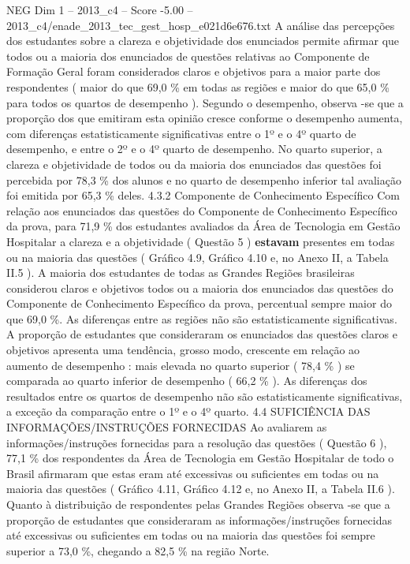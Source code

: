 \begin{textsample}{NEG Dim 1 – 2013\_c4 – Score -5.00 – 2013\_c4/enade\_2013\_tec\_gest\_hosp\_e021d6e676.txt}
A análise das percepções dos estudantes sobre a clareza e objetividade dos enunciados permite afirmar que todos ou a maioria dos enunciados de questões relativas ao Componente de Formação Geral foram considerados claros e objetivos para a maior parte dos respondentes ( maior do que 69,0 \% em todas as regiões e maior do que 65,0 \% para todos os quartos de desempenho ).
Segundo o desempenho, observa -se que a proporção dos que emitiram esta opinião cresce conforme o desempenho aumenta, com diferenças estatisticamente significativas entre o 1º e o 4º quarto de desempenho, e entre o 2º e o 4º quarto de desempenho.
No quarto superior, a clareza e objetividade de todos ou da maioria dos enunciados das questões foi percebida por 78,3 \% dos alunos e no quarto de desempenho inferior tal avaliação foi emitida por 65,3 \% deles. 4.3.2 Componente de Conhecimento Específico Com relação aos enunciados das questões do Componente de Conhecimento Específico da prova, para 71,9 \% dos estudantes avaliados da Área de Tecnologia em Gestão Hospitalar a clareza e a objetividade ( Questão 5 ) \textbf{estavam} presentes em todas ou na maioria das questões ( Gráfico 4.9, Gráfico 4.10 e, no Anexo II, a Tabela II.5 ).
A maioria dos estudantes de todas as Grandes Regiões brasileiras considerou claros e objetivos todos ou a maioria dos enunciados das questões do Componente de Conhecimento Específico da prova, percentual sempre maior do que 69,0 \%.
As diferenças entre as regiões não são estatisticamente significativas.
A proporção de estudantes que consideraram os enunciados das questões claros e objetivos apresenta uma tendência, grosso modo, crescente em relação ao aumento de desempenho : mais elevada no quarto superior ( 78,4 \% ) se comparada ao quarto inferior de desempenho ( 66,2 \% ).
As diferenças dos resultados entre os quartos de desempenho não são estatisticamente significativas, a exceção da comparação entre o 1º e o 4º quarto. 4.4 SUFICIÊNCIA DAS INFORMAÇÕES/INSTRUÇÕES FORNECIDAS Ao avaliarem as informações/instruções fornecidas para a resolução das questões ( Questão 6 ), 77,1 \% dos respondentes da Área de Tecnologia em Gestão Hospitalar de todo o Brasil afirmaram que estas eram até excessivas ou suficientes em todas ou na maioria das questões ( Gráfico 4.11, Gráfico 4.12 e, no Anexo II, a Tabela II.6 ).
Quanto à distribuição de respondentes pelas Grandes Regiões observa -se que a proporção de estudantes que consideraram as informações/instruções fornecidas até excessivas ou suficientes em todas ou na maioria das questões foi sempre superior a 73,0 \%, chegando a 82,5 \% na região Norte.

\end{textsample}
